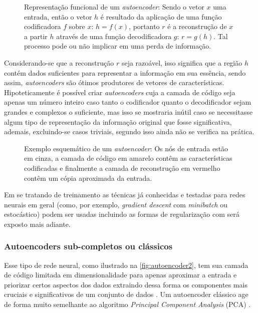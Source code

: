 			\begin{figure}[h]
				\centering
				\caption[Representação funcional de um autoencoder]{Representação funcional de um \textit{autoencoder}: Sendo o vetor $x$ uma entrada, então o vetor $h$ é resultado da aplicação de uma função codificadora $f$ sobre $x$: $h = f(x)$, portanto $r$ é a reconstrução de $x$ a partir $h$ através de uma função decodificadora $g$: $r = g(h)$. Tal processo pode ou não implicar em uma perda de informação.}
				
				\label{fig:autoencoder}
			\end{figure}
		
			\par Considerando-se que a reconstrução $r$ seja razoável, isso significa que a região $h$  contém dados suficientes para representar a informação em sua essência, sendo assim, \textit{autoencoders} são ótimos produtores de vetores de características. Hipoteticamente é possível criar \textit{autoencoders} cuja a camada de código seja apenas um número inteiro caso tanto o codificador quanto o decodificador sejam grandes e complexos o suficiente, mas isso se mostraria inútil caso se necessitasse algum tipo de representação da informação original que fosse significativa, ademais, excluindo-se casos triviais, segundo \cite{Goodfellow-et-al-2016} isso ainda não se verifica na prática.

			\begin{figure}[h]
				\centering
				\caption[Exemplo esquemático de um autoencoder]{Exemplo esquemático de um \textit{autoencoder}: Os nós de entrada estão em cinza, a camada de código em amarelo contêm as características codificadas e finalmente a camada de reconstrução em vermelho contêm um cópia aproximada da entrada.}
				
				\label{fig:autoencoder2}
			\end{figure}

			\par Em se tratando de treinamento as técnicas já conhecidas e testadas para redes neurais em geral (como, por exemplo, \textit{gradient descent} com \textit{minibatch} ou estocástico) podem ser usadas  \cite{Goodfellow-et-al-2016} incluindo as formas de regularização com será exposto mais adiante.
			
			\subsubsection{Autoencoders sub-completos ou clássicos}
				\par Esse tipo de rede neural, como ilustrado na  \autoref{fig:autoencoder2}, tem sua camada de código limitada em dimensionalidade para apenas aproximar a entrada e priorizar certos aspectos dos dados extraindo dessa forma os componentes mais cruciais e significativos de um conjunto de dados \cite{Goodfellow-et-al-2016}. Um autoencoder clássico age de forma muito semelhante ao algoritmo
				\textit{Principal Component Analysis} (PCA) \cite{bengio2014representation}.
				  

